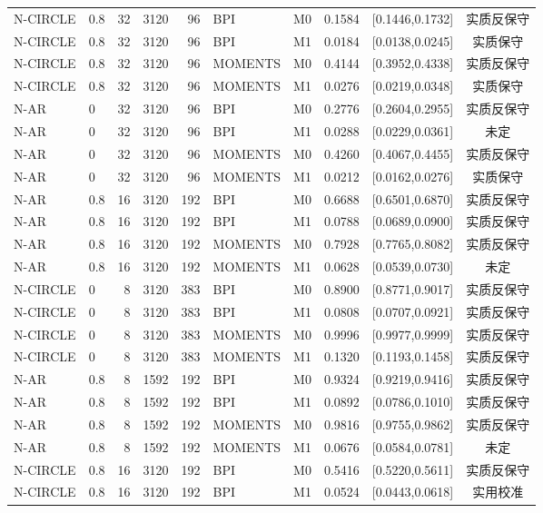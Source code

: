 \documentclass[UTF8,zihao=-4]{ctexart}
\theoremstyle{remark}
\begin{document}
\begin{longtable}{llrlrlrrc c}
N-CIRCLE & 0.8 & 32 & 3120 & 96 & BPI & M0 & 0.1584 & [0.1446,0.1732] & 实质反保守\\
N-CIRCLE & 0.8 & 32 & 3120 & 96 & BPI & M1 & 0.0184 & [0.0138,0.0245] & 实质保守\\
N-CIRCLE & 0.8 & 32 & 3120 & 96 & MOMENTS & M0 & 0.4144 & [0.3952,0.4338] & 实质反保守\\
N-CIRCLE & 0.8 & 32 & 3120 & 96 & MOMENTS & M1 & 0.0276 & [0.0219,0.0348] & 实质保守\\
N-AR & 0 & 32 & 3120 & 96 & BPI & M0 & 0.2776 & [0.2604,0.2955] & 实质反保守\\
N-AR & 0 & 32 & 3120 & 96 & BPI & M1 & 0.0288 & [0.0229,0.0361] & 未定\\
N-AR & 0 & 32 & 3120 & 96 & MOMENTS & M0 & 0.4260 & [0.4067,0.4455] & 实质反保守\\
N-AR & 0 & 32 & 3120 & 96 & MOMENTS & M1 & 0.0212 & [0.0162,0.0276] & 实质保守\\
N-AR & 0.8 & 16 & 3120 & 192 & BPI & M0 & 0.6688 & [0.6501,0.6870] & 实质反保守\\
N-AR & 0.8 & 16 & 3120 & 192 & BPI & M1 & 0.0788 & [0.0689,0.0900] & 实质反保守\\
N-AR & 0.8 & 16 & 3120 & 192 & MOMENTS & M0 & 0.7928 & [0.7765,0.8082] & 实质反保守\\
N-AR & 0.8 & 16 & 3120 & 192 & MOMENTS & M1 & 0.0628 & [0.0539,0.0730] & 未定\\
N-CIRCLE & 0 & 8 & 3120 & 383 & BPI & M0 & 0.8900 & [0.8771,0.9017] & 实质反保守\\
N-CIRCLE & 0 & 8 & 3120 & 383 & BPI & M1 & 0.0808 & [0.0707,0.0921] & 实质反保守\\
N-CIRCLE & 0 & 8 & 3120 & 383 & MOMENTS & M0 & 0.9996 & [0.9977,0.9999] & 实质反保守\\
N-CIRCLE & 0 & 8 & 3120 & 383 & MOMENTS & M1 & 0.1320 & [0.1193,0.1458] & 实质反保守\\
N-AR & 0.8 & 8 & 1592 & 192 & BPI & M0 & 0.9324 & [0.9219,0.9416] & 实质反保守\\
N-AR & 0.8 & 8 & 1592 & 192 & BPI & M1 & 0.0892 & [0.0786,0.1010] & 实质反保守\\
N-AR & 0.8 & 8 & 1592 & 192 & MOMENTS & M0 & 0.9816 & [0.9755,0.9862] & 实质反保守\\
N-AR & 0.8 & 8 & 1592 & 192 & MOMENTS & M1 & 0.0676 & [0.0584,0.0781] & 未定\\
N-CIRCLE & 0.8 & 16 & 3120 & 192 & BPI & M0 & 0.5416 & [0.5220,0.5611] & 实质反保守\\
N-CIRCLE & 0.8 & 16 & 3120 & 192 & BPI & M1 & 0.0524 & [0.0443,0.0618] & 实用校准\\

\end{longtable}
\end{document}
